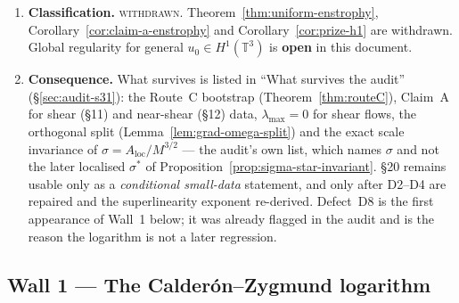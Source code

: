 \documentclass[11pt]{article}
\theoremstyle{definition}
\theoremstyle{remark}
\newcommand{\T}{\mathbb{T}}
\begin{document}
\begin{enumerate}[label=(\alph*),leftmargin=2.2em]
\begin{enumerate}[label=\textup{D\arabic*.},leftmargin=2.6em]
        finite time;
      \item unproved $|\nabla^2\omega|^2$-coercivity in
        Lemma~\ref{lem:A-evol}, whose stretching estimate also uses
        $\|\nabla u\|_{L^\infty}\leq CM$ --- Calder\'on--Zygmund operators
        are unbounded on $L^\infty$ and the correct bound carries a
        logarithm.
    \end{enumerate}
  \item \textbf{Classification.} \textsc{withdrawn.}
    Theorem~\ref{thm:uniform-enstrophy}, Corollary~\ref{cor:claim-a-enstrophy}
    and Corollary~\ref{cor:prize-h1} are withdrawn. Global regularity for
    general $u_0\in H^1(\T^3)$ is \textbf{open} in this document.
  \item \textbf{Consequence.} What survives is listed in ``What survives the
    audit'' (\S\ref{sec:audit-s31}): the Route~C bootstrap
    (Theorem~\ref{thm:routeC}), Claim~A for shear (\S11) and near-shear
    (\S12) data, $\lambda_{\max}=0$ for shear flows, the orthogonal split
    (Lemma~\ref{lem:grad-omega-split}) and the exact scale invariance of
    $\sigma=A_{\mathrm{loc}}/M^{3/2}$ --- the audit's own list, which names
    $\sigma$ and not the later localised $\sigma^*$ of
    Proposition~\ref{prop:sigma-star-invariant}. \S20 remains
    usable only as a \emph{conditional small-data} statement, and only after
    D2--D4 are repaired and the superlinearity exponent re-derived. Defect~D8
    is the first appearance of Wall~1 below; it was already flagged in the
    audit and is the reason the logarithm is not a later regression.
\end{enumerate}

\subsection{Wall 1 --- The Calder\'on--Zygmund logarithm}
\label{subsec:wall1-cz}
\end{document}
